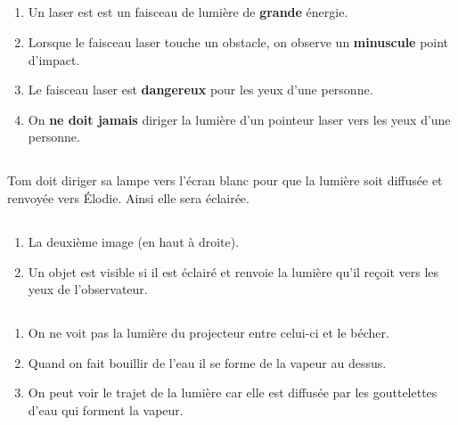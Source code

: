 \documentclass[12pt,a4paper]{article}
\begin{document}
\subsection*{}

\begin{enumerate}[label=\alph*)]
	\item Un laser est est un faisceau de lumière de \textbf{grande} énergie.
	\item Lorsque le faisceau laser touche un obstacle, on observe un \textbf{minuscule} point d'impact.
	\item Le faisceau laser est  \textbf{dangereux} pour les yeux d'une personne.
	\item On \textbf{ne doit jamais} diriger la lumière d'un pointeur laser vers les yeux d'une personne. 
\end{enumerate}

\subsection*{}

	Tom doit diriger sa lampe vers l'écran blanc pour que la lumière soit diffusée et renvoyée vers \'Elodie. Ainsi elle sera éclairée.
	
\subsection*{}
	\begin{enumerate}[label=\alph*)]
		\item La deuxième image (en haut à droite).
		\item Un objet est visible si il est éclairé et renvoie la lumière qu'il reçoit vers les yeux de l'observateur.
	\end{enumerate}

\subsection*{}
	\begin{enumerate}[label=\alph*)]
		\item On ne voit pas la lumière du projecteur entre celui-ci et le bécher.
		\item Quand on fait bouillir de l'eau il se forme de la vapeur au dessus.
		\item On peut voir le trajet de la lumière car elle est diffusée par les gouttelettes d'eau qui forment la vapeur.
	\end{enumerate}
\end{document}

